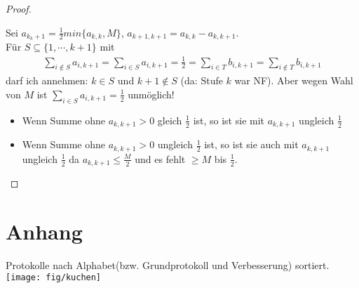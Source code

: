 \documentclass[a4paper,10pt]{scrartcl}
\begin{document}
\begin{proof}
\begin{description}
   Sei $a_{k_k+1}=\frac{1}{2}min\{a_{k,k},M\}$, $a_{k+1,k+1}=a_{k,k}-a_{k,k+1}$.\\
   Für $S\subseteq\{1,\cdots,k+1\}$ mit
   \begin{align*}
    \sum\limits_{i\not\in S}a_{i,k+1} = \sum\limits_{i\in S}a_{i,k+1}=\frac{1}{2}=\sum\limits_{i\in T}b_{i,k+1}=\sum\limits_{i\not\in T}
     b_{i,k+1}
   \end{align*}
   darf ich annehmen: $k\in S$ und $k+1\not\in S$ (da: Stufe $k$ war NF). Aber wegen Wahl von $M$ ist $\sum\limits_{i\in S}a_{i,k+1}=
   \frac{1}{2}$ unmöglich!
   \begin{itemize}
    \item Wenn Summe ohne $a_{k,k+1}>0$ gleich $\frac{1}{2}$ ist, so ist sie mit $a_{k,k+1}$ ungleich $\frac{1}{2}$
    \item Wenn Summe ohne $a_{k,k+1}>0$ ungleich $\frac{1}{2}$ ist, so ist sie auch mit $a_{k,k+1}$ ungleich $\frac{1}{2}$ da 
          $a_{k,k+1}\leq\frac{M}{2}$ und es fehlt $\geq M$ bis $\frac{1}{2}$.
   \end{itemize}
 \end{description}
\end{proof}

\appendix
\section*{Anhang}
\centering Protokolle nach Alphabet(bzw. Grundprotokoll und Verbesserung) sortiert.
\texttt{[image: fig/kuchen]}














\end{document}

